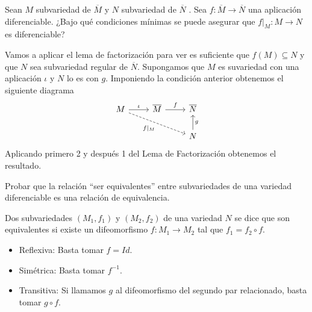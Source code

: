 \documentclass[twoside]{article}
\newcounter{ejercicio}
\begin{document}
\newpage

\begin{ejercicio}{12}
Sean $M$ subvariedad de $\overline{M}$ y $N$ subvariedad de $\overline{N}$ . Sea $f : \overline{M} \to \overline{N}$ una
aplicación diferenciable. ¿Bajo qué condiciones mínimas se puede asegurar
que $f|_M : M \to N$ es diferenciable?
\end{ejercicio}
\begin{solucion}
Vamos a aplicar el lema de factorización para ver es suficiente que $f(M)\subseteq N$ y que $N$ sea subvariedad regular de $\overline{N}$. Supongamos que $M$ es suvariedad con una aplicación $\iota$ y $N$ lo es con $g$. Imponiendo la condición anterior obtenemos el siguiente diagrama
\[
\begin{tikzcd}
M\arrow[r,"\iota"]\arrow[drr, dashed, "f|_M"']& \overline{M}\arrow[r,"f"] &\overline{N}\\
& & N\arrow[u, "g"']
\end{tikzcd}
\]
Aplicando primero 2 y después 1 del Lema de Factorización obtenemos el resultado.
\end{solucion}

\newpage

\begin{ejercicio}{13}
Probar que la relación ``ser equivalentes'' entre subvariedades de una variedad
diferenciable es una relación de equivalencia.
\end{ejercicio}
\begin{solucion}
Dos subvariedades $(M_1, f_1)$ y $(M_2, f_2)$ de una variedad $N$ se
dice que son equivalentes si existe un difeomorfismo $f : M_1 \to M_2$ tal que
$f_1 = f_2 \circ f$.
\begin{itemize}
\item Reflexiva: Basta tomar $f=Id$. 
\item Simétrica: Basta tomar $f^{-1}$.
\item Transitiva: Si llamamos $g$ al difeomorfismo del segundo par relacionado, basta tomar $g\circ f$.
\end{itemize}
\end{solucion}

\newpage
\end{document}
